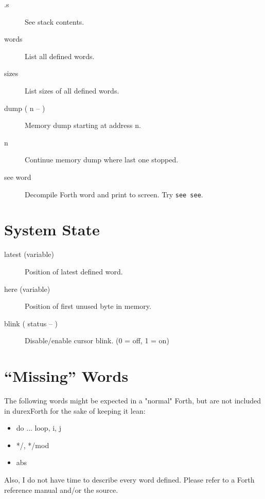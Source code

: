 \begin{description}
\item[.s]

See stack contents.

\item[words]

List all defined words.

\item[sizes]

List sizes of all defined words.

\item[dump ( n -- )]

Memory dump starting at address n.

\item[n]

Continue memory dump where last one stopped.

\item[see word]

Decompile Forth word and print to screen. Try \texttt{see see}.

\end{description}



\section{System State}

\begin{description}

\item[latest (variable)] Position of latest defined word.

\item[here (variable)] Position of first unused byte in memory.

\item[blink ( status -- )] Disable/enable cursor blink. (0 = off, 1 = on)

\end{description}



\section{``Missing'' Words}

The following words might be expected in a "normal" Forth, but are not included in durexForth for the sake of keeping it lean:

\begin{itemize}
\item do ... loop, i, j
\item */, */mod
\item abs
\end{itemize}

Also, I do not have time to describe every word defined. Please refer to a Forth reference manual and/or the source.
